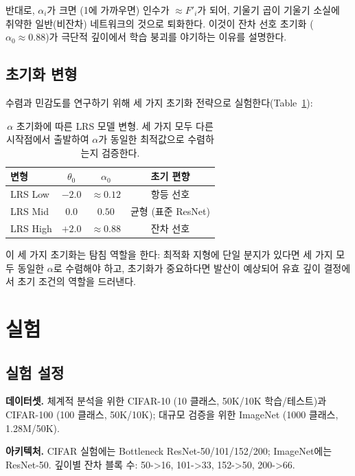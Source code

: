\documentclass[preprint,12pt]{elsarticle}
\begin{document}
반대로, $\alpha_i$가 크면 (1에 가까우면) 인수가 $\approx F'_i$가 되어, 기울기 곱이 기울기 소실에 취약한 일반(비잔차) 네트워크의 것으로 퇴화한다. 이것이 잔차 선호 초기화 ($\alpha_0 \approx 0.88$)가 극단적 깊이에서 학습 붕괴를 야기하는 이유를 설명한다.

\subsection{초기화 변형}

수렴과 민감도를 연구하기 위해 세 가지 초기화 전략으로 실험한다(Table~\ref{tab:init_variants}):

\begin{table}[t]
\centering
\caption{$\alpha$ 초기화에 따른 LRS 모델 변형. 세 가지 모두 다른 시작점에서 출발하여 $\alpha$가 동일한 최적값으로 수렴하는지 검증한다.}
\label{tab:init_variants}
\begin{tabular}{lccc}
\toprule
\textbf{변형} & $\theta_0$ & $\alpha_0$ & \textbf{초기 편향} \\
\midrule
LRS Low  & $-2.0$ & $\approx 0.12$ & 항등 선호 \\
LRS Mid  & $0.0$  & $0.50$         & 균형 (표준 ResNet) \\
LRS High & $+2.0$  & $\approx 0.88$ & 잔차 선호 \\
\bottomrule
\end{tabular}
\end{table}

이 세 가지 초기화는 탐침 역할을 한다: 최적화 지형에 단일 분지가 있다면 세 가지 모두 동일한 $\alpha$로 수렴해야 하고, 초기화가 중요하다면 발산이 예상되어 유효 깊이 결정에서 초기 조건의 역할을 드러낸다.

\section{실험}
\label{sec:experiments}

\subsection{실험 설정}
\label{sec:setup}

\textbf{데이터셋.} 체계적 분석을 위한 CIFAR-10 (10 클래스, 50K/10K 학습/테스트)과 CIFAR-100 (100 클래스, 50K/10K); 대규모 검증을 위한 ImageNet (1000 클래스, 1.28M/50K).

\textbf{아키텍처.} CIFAR 실험에는 Bottleneck ResNet-50/101/152/200; ImageNet에는 ResNet-50. 깊이별 잔차 블록 수: 50->16, 101->33, 152->50, 200->66.
\end{document}
